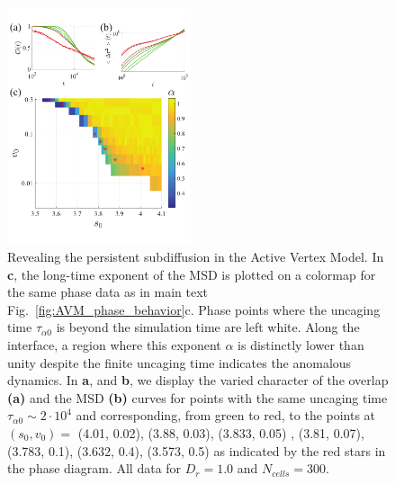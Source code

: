 \documentclass[
reprint
,aps
,amssymb
,amsmath
,superscriptaddress
]{revtex4-1}
\begin{document}
\begin{figure}[!t]  
\begin{center}
    \includegraphics[width=0.48\textwidth]{manuscript_images_app_avm_subdiffusive.pdf}
    \caption{\label{fig:app_avm_subdiffusive} Revealing the persistent subdiffusion in the Active Vertex Model. In \textbf{c}, the long-time exponent of the MSD is plotted on a colormap for the same phase data as in main text Fig.~\ref{fig:AVM_phase_behavior}c. Phase points where the uncaging time $\tau_{\alpha0}$ is beyond the simulation time are left white. Along the interface, a region where this exponent $\alpha$ is distinctly lower than unity despite the finite uncaging time indicates the anomalous dynamics. In \textbf{a}, and \textbf{b}, we display the varied character of the overlap \textbf{(a)} and the MSD \textbf{(b)} curves for points with the same uncaging time $\tau_{\alpha0} \sim 2 \cdot 10^4$ and corresponding, from green to red, to the points at $(s_0, v_0) =$ (4.01, 0.02), (3.88, 0.03), (3.833, 0.05) , (3.81, 0.07), (3.783, 0.1), (3.632, 0.4), (3.573, 0.5) as indicated by the red stars in the phase diagram. All data for $D_r = 1.0$ and $N_{cells} = 300$. }
    \end{center}
  \end{figure}
\end{document}
